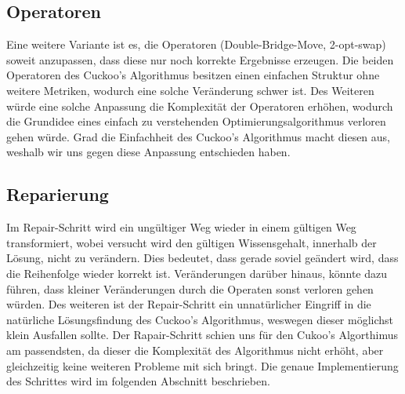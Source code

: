 \documentclass[conference]{IEEEtran}
\begin{document}
    \subsection{Operatoren} 
      Eine weitere Variante ist es, die Operatoren (Double-Bridge-Move, 2-opt-swap) soweit anzupassen, dass diese
      nur noch korrekte Ergebnisse erzeugen. Die beiden Operatoren des Cuckoo's Algorithmus besitzen einen einfachen 
      Struktur ohne weitere Metriken, wodurch eine solche Veränderung schwer ist. 
      Des Weiteren würde eine solche Anpassung die Komplexität der Operatoren erhöhen, wodurch die Grundidee eines 
      einfach zu verstehenden Optimierungsalgorithmus verloren gehen würde. 
      Grad die Einfachheit des Cuckoo's Algorithmus macht diesen aus, weshalb wir uns gegen diese Anpassung entschieden haben.

    \subsection{Reparierung}
      Im Repair-Schritt wird ein ungültiger Weg wieder in einem gültigen Weg transformiert, wobei 
      versucht wird den gültigen Wissensgehalt, innerhalb der Lösung, nicht zu verändern. Dies bedeutet, 
      dass gerade soviel geändert wird, dass die Reihenfolge wieder korrekt ist. Veränderungen darüber hinaus, 
      könnte dazu führen, dass kleiner Veränderungen durch die Operaten sonst verloren gehen würden.
      Des weiteren ist der Repair-Schritt ein unnatürlicher Eingriff in die natürliche Lösungsfindung des Cuckoo's Algorithmus, 
      weswegen dieser möglichst klein Ausfallen sollte.
      Der Rapair-Schritt schien uns für den Cukoo's Algorthimus am passendsten, da dieser die Komplexität des Algorithmus nicht erhöht, aber 
      gleichzeitig keine weiteren Probleme mit sich bringt. 
      Die genaue Implementierung des Schrittes wird im folgenden Abschnitt beschrieben.
\end{document}
